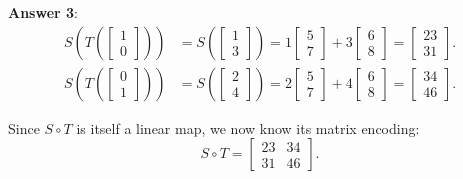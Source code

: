 \begin{itemize}
	\textbf{Answer 3}:
	\begin{align*}
		S\left( T\left( \begin{bmatrix} 1 \\ 0 \end{bmatrix} \right) \right)
		&= S\left( \begin{bmatrix} 1 \\ 3 \end{bmatrix} \right)
		= 1 \begin{bmatrix} 5 \\ 7 \end{bmatrix} + 3 \begin{bmatrix} 6 \\ 8 \end{bmatrix}
			= \begin{bmatrix} 23 \\ 31 \end{bmatrix}. \\
		S\left( T\left( \begin{bmatrix} 0 \\1 \end{bmatrix} \right) \right)
		&= S\left( \begin{bmatrix} 2 \\ 4 \end{bmatrix} \right)
		= 2 \begin{bmatrix} 5 \\ 7 \end{bmatrix}
			+ 4 \begin{bmatrix} 6 \\ 8 \end{bmatrix}
		= \begin{bmatrix} 34 \\ 46 \end{bmatrix}.
	\end{align*}
\end{itemize}
Since $S \circ T$ is itself a linear map, we now know its matrix encoding:
\[ S \circ T = \begin{bmatrix} 23 & 34 \\ 31 & 46 \end{bmatrix}. \]

